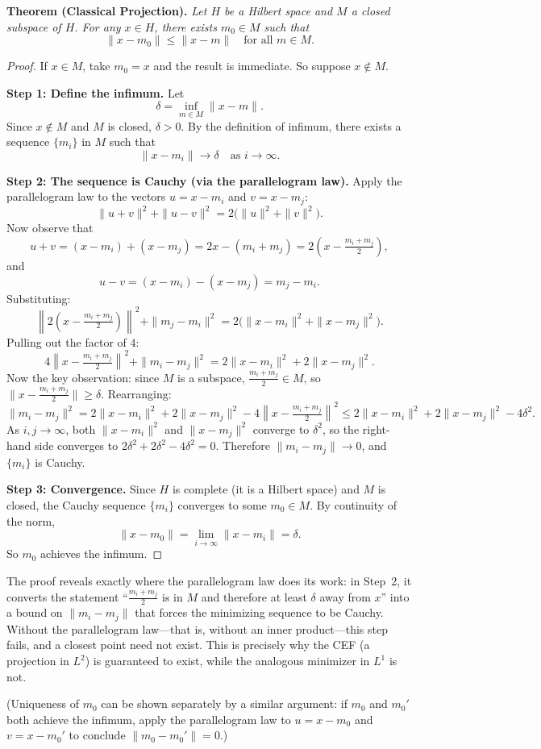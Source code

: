 \documentclass[11pt]{article}
\begin{document}
\noindent\textbf{Theorem (Classical Projection).}
\textit{Let $H$ be a Hilbert space and $M$ a closed subspace of $H$. For any $x\in H$, there exists $m_0\in M$ such that}
\[
\|x - m_0\| \leq \|x - m\| \quad \text{for all } m\in M.
\]

\begin{proof}
If $x\in M$, take $m_0 = x$ and the result is immediate. So suppose $x\notin M$.

\medskip

\noindent\textbf{Step 1: Define the infimum.}
Let
\[
\delta = \inf_{m\in M} \|x - m\|.
\]
Since $x\notin M$ and $M$ is closed, $\delta > 0$. By the definition of infimum, there exists a sequence $\{m_i\}$ in $M$ such that
\[
\|x - m_i\| \to \delta \quad\text{as } i\to\infty.
\]

\medskip

\noindent\textbf{Step 2: The sequence is Cauchy (via the parallelogram law).}
Apply the parallelogram law to the vectors $u = x - m_i$ and $v = x - m_j$:
\[
\|u + v\|^2 + \|u - v\|^2 = 2\bigl(\|u\|^2 + \|v\|^2\bigr).
\]
Now observe that
\[
u + v = (x - m_i) + (x - m_j) = 2x - (m_i + m_j) = 2\!\left(x - \tfrac{m_i + m_j}{2}\right),
\]
and
\[
u - v = (x - m_i) - (x - m_j) = m_j - m_i.
\]
Substituting:
\[
\left\|2\!\left(x - \tfrac{m_i+m_j}{2}\right)\right\|^2 + \|m_j - m_i\|^2
= 2\bigl(\|x - m_i\|^2 + \|x - m_j\|^2\bigr).
\]
Pulling out the factor of $4$:
\[
4\left\|x - \tfrac{m_i+m_j}{2}\right\|^2 + \|m_i - m_j\|^2
= 2\|x - m_i\|^2 + 2\|x - m_j\|^2.
\]
Now the key observation: since $M$ is a subspace, $\frac{m_i + m_j}{2}\in M$, so $\|x - \frac{m_i+m_j}{2}\| \geq \delta$. Rearranging:
\[
\|m_i - m_j\|^2
= 2\|x - m_i\|^2 + 2\|x - m_j\|^2 - 4\left\|x - \tfrac{m_i+m_j}{2}\right\|^2
\leq 2\|x - m_i\|^2 + 2\|x - m_j\|^2 - 4\delta^2.
\]
As $i,j\to\infty$, both $\|x - m_i\|^2$ and $\|x - m_j\|^2$ converge to $\delta^2$, so the right-hand side converges to $2\delta^2 + 2\delta^2 - 4\delta^2 = 0$. Therefore $\|m_i - m_j\| \to 0$, and $\{m_i\}$ is Cauchy.

\medskip

\noindent\textbf{Step 3: Convergence.}
Since $H$ is complete (it is a Hilbert space) and $M$ is closed, the Cauchy sequence $\{m_i\}$ converges to some $m_0\in M$. By continuity of the norm,
\[
\|x - m_0\| = \lim_{i\to\infty} \|x - m_i\| = \delta.
\]
So $m_0$ achieves the infimum.
\end{proof}

\medskip

The proof reveals exactly where the parallelogram law does its work: in Step~2, it converts the statement ``$\frac{m_i+m_j}{2}$ is in $M$ and therefore at least $\delta$ away from $x$'' into a bound on $\|m_i - m_j\|$ that forces the minimizing sequence to be Cauchy. Without the parallelogram law---that is, without an inner product---this step fails, and a closest point need not exist. This is precisely why the CEF (a projection in $L^2$) is guaranteed to exist, while the analogous minimizer in $L^1$ is not.

(Uniqueness of $m_0$ can be shown separately by a similar argument: if $m_0$ and $m_0'$ both achieve the infimum, apply the parallelogram law to $u = x - m_0$ and $v = x - m_0'$ to conclude $\|m_0 - m_0'\| = 0$.)
\end{document}
